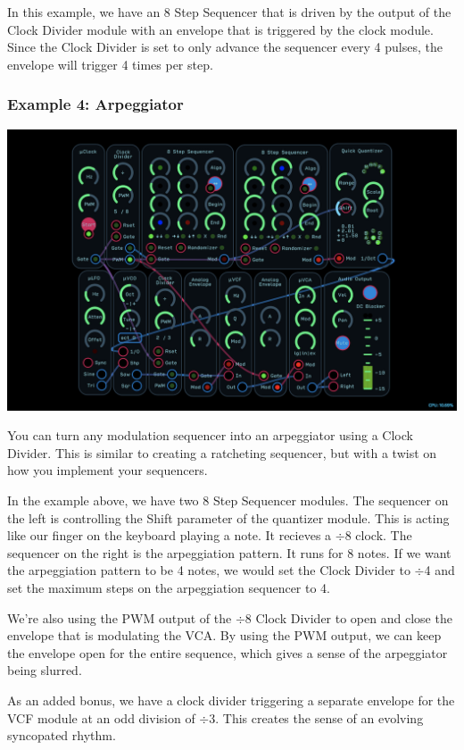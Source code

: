 \documentclass[11pt]{book}
\begin{document}
\begin{multicols*}{2}
In this example, we have an 8 Step Sequencer that is driven by the output of the Clock Divider module with an envelope that is triggered by the clock module. Since the Clock Divider is set to only advance the sequencer every 4 pulses, the envelope will trigger 4 times per step.

\subsubsection*{Example 4: Arpeggiator}

\begin{center}
\includegraphics[width=0.95\linewidth]{clock-divider-fig10.png}
\end{center}

You can turn any modulation sequencer into an arpeggiator using a Clock Divider. This is similar to creating a ratcheting sequencer, but with a twist on how you implement your sequencers.

In the example above, we have two 8 Step Sequencer modules. The sequencer on the left is controlling the Shift parameter of the quantizer module. This is acting like our finger on the keyboard playing a note. It recieves a $\div$8 clock. The sequencer on the right is the arpeggiation pattern. It runs for 8 notes. If we want the arpeggiation pattern to be 4 notes, we would set the Clock Divider to $\div$4 and set the maximum steps on the arpeggiation sequencer to 4.

We're also using the PWM output of the $\div$8 Clock Divider to open and close the envelope that is modulating the VCA. By using the PWM output, we can keep the envelope open for the entire sequence, which gives a sense of the arpeggiator being slurred.

As an added bonus, we have a clock divider triggering a separate envelope for the VCF module at an odd division of $\div$3. This creates the sense of an evolving syncopated rhythm.

\end{multicols*}
\end{document}
